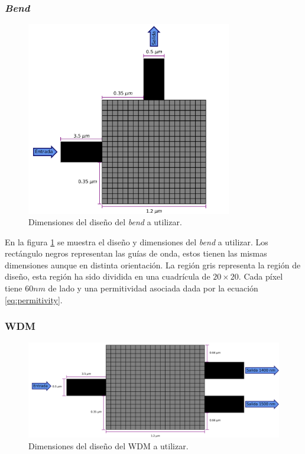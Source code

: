 \subsubsection{\emph{Bend}}

\begin{figure}[ht]
  \centering
  \includegraphics[width=0.8\textwidth]{image/proposal/bend.png}
  \caption{Dimensiones del diseño del \emph{bend} a utilizar.}
  \label{fig:dimensiones-bend}
\end{figure}

En la figura \ref{fig:dimensiones-bend} se muestra el diseño y dimensiones del \emph{bend} a utilizar.
Los rectángulo negros representan las guías de onda, estos tienen las mismas dimensiones aunque en distinta orientación.
La región gris representa la región de diseño, esta región ha sido dividida en una cuadrícula de $20 \times 20$.
Cada píxel tiene $60 nm$ de lado y una permitividad asociada dada por la ecuación \ref{eq:permitivity}.

\subsubsection{WDM}

\begin{figure}[ht]
  \centering
  \includegraphics[width=\textwidth]{image/proposal/demultiplexer.png}
  \caption{Dimensiones del diseño del WDM a utilizar.}
  \label{fig:dimensiones-demultiplexer}
\end{figure}


